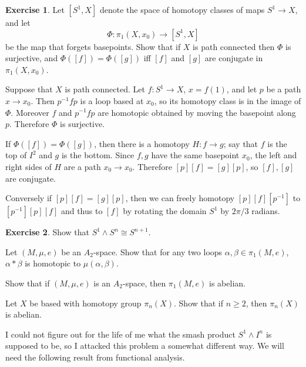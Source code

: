 \documentclass[10pt]{article}
\theoremstyle{definition}
\newtheorem{exer}{Exercise}
\begin{document}
\begin{exer}
Let $[S^1, X]$ denote the space of homotopy classes of maps $S^1 \to X$, and let
$$\Phi: \pi_1(X, x_0) \to [S^1, X]$$
be the map that forgets basepoints. Show that if $X$ is path connected then $\Phi$ is surjective, and $\Phi([f]) = \Phi([g])$ iff $[f]$ and $[g]$ are conjugate in $\pi_1(X, x_0)$.
\end{exer}

Suppose that $X$ is path connected.
Let $f: S^1 \to X$, $x = f(1)$, and let $p$ be a path $x \to x_0$. Then $p^{-1}fp$ is a loop based at $x_0$, so its homotopy class is in the image of $\Phi$. Moreover $f$ and $p^{-1}fp$ are homotopic obtained by moving the basepoint along $p$.
Therefore $\Phi$ is surjective.

If $\Phi([f]) = \Phi([g])$, then there is a homotopy $H: f \to g$; say that $f$ is the top of $I^2$ and $g$ is the bottom. Since $f,g$ have the same basepoint $x_0$, the left and right sides of $H$ are a path $x_0 \to x_0$. Therefore $[p][f] = [g][p]$, so $[f],[g]$ are conjugate.

Conversely if $[p][f] = [g][p]$, then we can freely homotopy $[p][f][p^{-1}]$ to $[p^{-1}][p][f]$ and thus to $[f]$ by rotating the domain $S^1$ by $2\pi/3$ radians.

\begin{exer}
Show that $S^1 \wedge S^n \cong S^{n+1}$.

Let $(M, \mu, e)$ be an $A_2$-space. Show that for any two loops $\alpha, \beta \in \pi_1(M, e)$, $\alpha*\beta$ is homotopic to $\mu(\alpha, \beta)$.

Show that if $(M, \mu, e)$ is an $A_2$-space, then $\pi_1(M, e)$ is abelian.

Let $X$ be based with homotopy group $\pi_n(X)$. Show that if $n \geq 2$, then $\pi_n(X)$ is abelian.
\end{exer}

I could not figure out for the life of me what the smash product $S^1 \wedge I^n$ is supposed to be, so I attacked this problem a somewhat different way.
We will need the following result from functional analysis.
\end{document}
